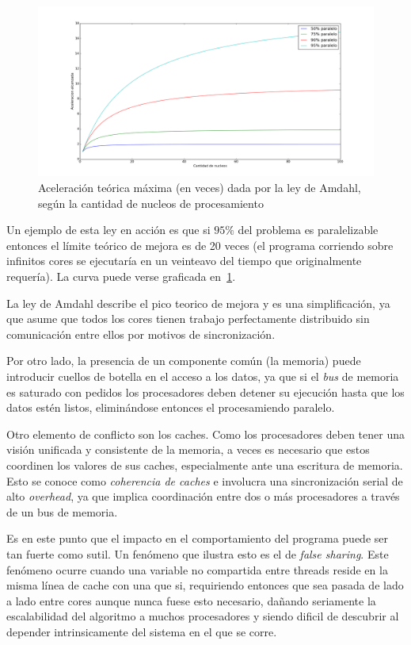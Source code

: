 \begin{figure}[htbp]
    \centering
    \includegraphics[width=\textwidth]{images/amdahl.png}
    \caption{Aceleraci\'on te\'orica m\'axima (en veces) dada por la ley de Amdahl, seg\'un la cantidad de nucleos de procesamiento}
    \label{fig:amdahl_plot}
\end{figure}

Un ejemplo de esta ley en acci\'on es que si $95 \%$ del problema es paralelizable entonces el l\'imite te\'orico de
mejora es de 20 veces (el programa corriendo sobre infinitos cores se ejecutar\'ia en un veinteavo del tiempo que originalmente
requer\'ia). La curva puede verse graficada en~\ref{fig:amdahl_plot}.

La ley de Amdahl describe el pico teorico de mejora y es una simplificaci\'on, ya que asume que todos los cores tienen
trabajo perfectamente distribuido sin comunicaci\'on entre ellos por motivos de sincronizaci\'on.

Por otro lado, la presencia de un componente com\'un (la memoria) puede introducir cuellos de botella en el acceso a los
datos, ya que si el \textit{bus} de memoria es saturado con pedidos los procesadores deben detener su ejecuci\'on hasta que
los datos est\'en listos, elimin\'andose entonces el procesamiendo paralelo.

Otro elemento de conflicto son los caches. Como los procesadores deben tener una visi\'on unificada y consistente de la
memoria, a veces es necesario que estos coordinen los valores de sus caches, especialmente ante una escritura de memoria.
Esto se conoce como \textit{coherencia de caches} e involucra una sincronizaci\'on serial de alto \textit{overhead}, ya
que implica coordinaci\'on entre dos o m\'as procesadores a trav\'es de un bus de memoria.

Es en este punto que el impacto en el comportamiento del programa puede ser tan fuerte como sutil. Un fen\'omeno que
ilustra esto es el de \textit{false sharing}. Este fen\'omeno ocurre cuando una variable no compartida entre threads
reside en la misma l\'inea de cache con una que si, requiriendo entonces que sea pasada de lado a lado entre cores aunque
nunca fuese esto necesario, da\~nando seriamente la escalabilidad del algoritmo a muchos procesadores y siendo
dificil de descubrir al depender intrinsicamente del sistema en el que se corre.
